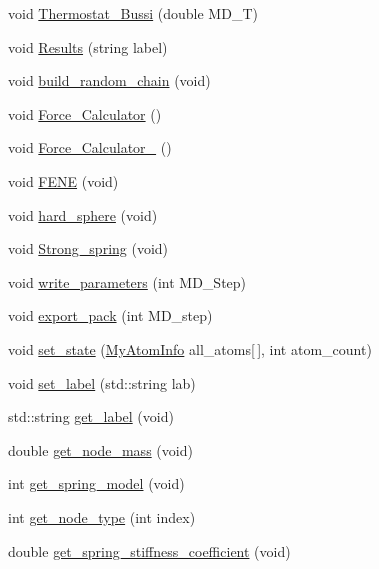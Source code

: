 \begin{DoxyCompactItemize}
\item 
void \mbox{\hyperlink{classChromatin_a0ab8a63487a5f0a955e0e72a67202687}{Thermostat\+\_\+\+Bussi}} (double M\+D\+\_\+T)
\item 
void \mbox{\hyperlink{classChromatin_a93559682020c26033dc0b4cdbff774f9}{Results}} (string label)
\item 
void \mbox{\hyperlink{classChromatin_ae3f17fd0b51db84a3890105f8f4a7028}{build\+\_\+random\+\_\+chain}} (void)
\item 
void \mbox{\hyperlink{classChromatin_a37cf6dcb2eca02312739e4b14e48c2b9}{Force\+\_\+\+Calculator}} ()
\item 
void \mbox{\hyperlink{classChromatin_a6afb5d9eb8c4d6e1c9e8145e1bccad6c}{Force\+\_\+\+Calculator\+\_}} ()
\item 
void \mbox{\hyperlink{classChromatin_a22b0a397c521e9775a0fedc027aaf709}{F\+E\+NE}} (void)
\item 
void \mbox{\hyperlink{classChromatin_aba53b27dd0a93bbd93fe619390e54749}{hard\+\_\+sphere}} (void)
\item 
void \mbox{\hyperlink{classChromatin_a9f8de53b9b39438ed966a9ad7cd5c962}{Strong\+\_\+spring}} (void)
\item 
void \mbox{\hyperlink{classChromatin_a2466415eebdaa0d409c8e6df432ebe9c}{write\+\_\+parameters}} (int M\+D\+\_\+\+Step)
\item 
void \mbox{\hyperlink{classChromatin_a73cbccc73e3676425082c8c233919ee0}{export\+\_\+pack}} (int M\+D\+\_\+step)
\item 
void \mbox{\hyperlink{classChromatin_a68ec2e0928d09f0b3c461a68f2865cb8}{set\+\_\+state}} (\mbox{\hyperlink{structMyAtomInfo}{My\+Atom\+Info}} all\+\_\+atoms\mbox{[}$\,$\mbox{]}, int atom\+\_\+count)
\item 
void \mbox{\hyperlink{classChromatin_ad8b7166a71afb0b69b6547b610bc2463}{set\+\_\+label}} (std\+::string lab)
\item 
std\+::string \mbox{\hyperlink{classChromatin_a7da207522e3baa2b5c0a4f220a553b7e}{get\+\_\+label}} (void)
\item 
double \mbox{\hyperlink{classChromatin_a85367f59e252bc117ea1e22f6fd23657}{get\+\_\+node\+\_\+mass}} (void)
\item 
int \mbox{\hyperlink{classChromatin_acc1d78b2faf43df1720d1f7f503d3630}{get\+\_\+spring\+\_\+model}} (void)
\item 
int \mbox{\hyperlink{classChromatin_a82bb23b48d3823a1b976716fac70ad70}{get\+\_\+node\+\_\+type}} (int index)
\item 
double \mbox{\hyperlink{classChromatin_a766c38975df75204e517629f55226f36}{get\+\_\+spring\+\_\+stiffness\+\_\+coefficient}} (void)

\end{DoxyCompactItemize}
